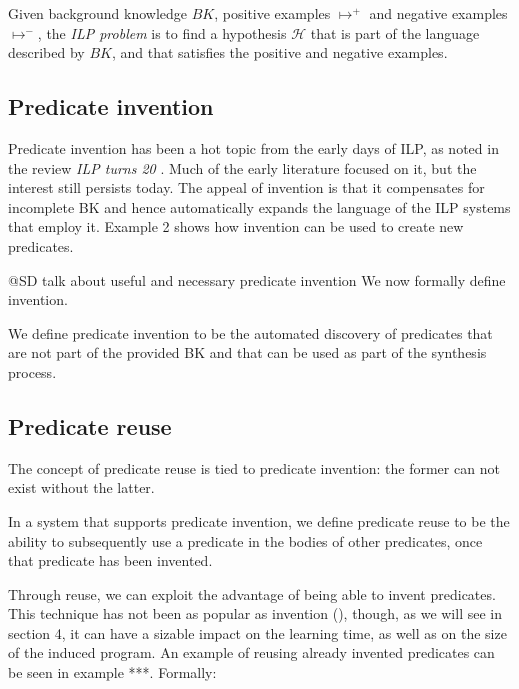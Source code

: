 \begin{defn}
Given background knowledge $BK$, positive examples $\mapsto^+$ and negative examples $\mapsto^-$, the \emph{ILP problem} is to find a hypothesis $\mathcal{H}$ that is part of the language described by $BK$, and that satisfies the positive and negative examples.
\end{defn}

\subsection{Predicate invention}
Predicate invention has been a hot topic from the early days of ILP, as noted in the review \textit{ILP turns 20} \cite{ilpturns20}. Much of the early literature focused on it, but the interest still persists today. The appeal of invention is that it compensates for incomplete BK and hence automatically expands the language of the ILP systems that employ it. Example 2 shows how invention can be used to create new predicates.

\begin{example}[Invention]

\end{example}
\ac{@SD talk about useful and necessary predicate invention}
We now formally define invention.

\begin{defn}[Invention]
We define predicate invention to be the automated discovery of predicates that are not part of the provided BK and that can be used as part of the synthesis process.
\end{defn}

\subsection{Predicate reuse}
The concept of predicate reuse is tied to predicate invention: the former can not exist without the latter.

\begin{defn}[Reuse]
In a system that supports predicate invention, we define predicate reuse to be the ability to subsequently use a predicate in the bodies of other predicates, once that predicate has been invented.
\end{defn}

Through reuse, we can exploit the advantage of being able to invent predicates. This technique has not been as popular as invention (), though, as we will see in section 4, it can have a sizable impact on the learning time, as well as on the size of the induced program. An example of reusing already invented predicates can be seen in example ***. Formally:
